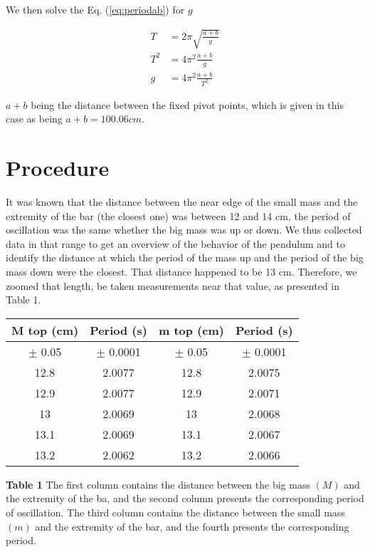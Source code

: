 \documentclass[12pt]{article}
\begin{document}
We then solve the Eq. (\ref{eq:periodab}) for $g$

\begin{equation}
    \begin{aligned}
        T&=2\pi \sqrt{\frac{a+b}{ g }} \\
        T^2&=4\pi^2 \frac{a+b}{ g } \\
        g&=4\pi^2\frac{ a+b }{ T^2 } \label{eq:final}
    \end{aligned}
\end{equation}

$a+b$ being the distance between the fixed pivot points, which is given in this case as being $a+b=100.06cm$.
\section*{Procedure}
It was known that the distance between the near edge of the small mass and the extremity of the bar (the closest one) was between 12 and 14 cm, the period of oscillation was the same whether the big mass was up or down. We thus collected data in that range to get an overview of the behavior of the pendulum and to identify the distance at which the period of the mass up and the period of the big mass down were the closest. That distance happened to be 13 cm. Therefore, we zoomed that length, be taken measurements near that value, as presented in Table 1. 


\begin{center}
    \begin{threeparttable}\label{tab:periods}
        \begin{tabular}{|c| c | c | c |}
            \hline
        M top (cm) & Period (s) & m top (cm) & Period (s) \\ \hline 
        $\pm$ 0.05 &$\pm$ 0.0001 & $\pm$ 0.05 & $\pm$ 0.0001 \\ \hline
        12.8       & 2.0077 & 12.8 &2.0075 \\ \hline
        12.9       & 2.0077 & 12.9 &2.0071 \\ \hline
        13         & 2.0069 & 13   &2.0068 \\ \hline
        13.1       & 2.0069 & 13.1 &2.0067 \\ \hline
        13.2       & 2.0062 & 13.2 &2.0066 \\ \hline
    \end{tabular}

    \begin{tablenotes}
    \item \footnotesize \textbf{Table 1} The first column contains the distance between the big mass $(M)$ and the extremity of the ba, and the second column presents the corresponding period of oscillation. The third column contains the distance between the small mass $(m)$ and the extremity of the bar, and the fourth presents the corresponding period.  
    \end{tablenotes}
\end{threeparttable}
\end{center}
\end{document}

